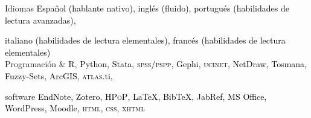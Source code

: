 





\begin{cvskills}

\cvskill
{Idiomas} 
{\textcolor{black}{Español (hablante nativo), inglés (fluido), portugués (habilidades de lectura avanzadas),}} 

\cvskill
{} 
{\textcolor{black}{italiano (habilidades de lectura elementales), francés (habilidades de lectura elementales)}} \\

\cvskill
{Programación \&} 
{\textcolor{black}{R, Python, Stata, {\scshape spss/pspp}, Gephi, {\scshape ucinet}, NetDraw, Tosmana, Fuzzy-Sets, ArcGIS, {\scshape atlas}.ti,}}

\cvskill
{software} 
{\textcolor{black}{EndNote, Zotero, {\scshape HPoP}, {\LaTeX}, Bib{\TeX}, JabRef, MS Office, WordPress, Moodle, {\scshape html}, {\scshape css}, {\scshape xhtml}}} \\

\end{cvskills}
